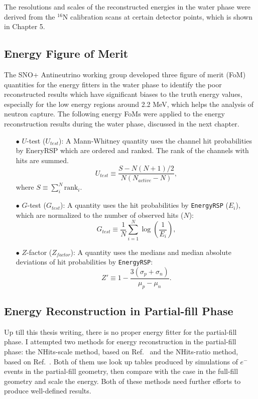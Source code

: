 The resolutions and scales of the reconstructed energies in the water phase were derived from the $^{16}$N calibration scans at certain detector points, which is shown in Chapter 5.

\subsection{Energy Figure of Merit}\label{sect:energy_fom}
The SNO+ Antineutrino working group developed three figure of merit (FoM) quantities for the energy fitters in the water phase to identify the poor reconstructed results which have significant biases to the truth energy values, especially for the low energy regions around 2.2 MeV, which helps the analysis of neutron capture\cite{waterFoM,waterunidoc}. The following energy FoMs were applied to the energy reconstruction results during the water phase, discussed in the next chapter.

\begin{itemize}
	\item[$\bullet$]$U$-test ($U_{test}$):
	A Mann-Whitney quantity uses the channel hit probabilities by EneryRSP which are ordered and ranked. The rank of the channels with hits are summed.%
		\begin{equation}
		U_{test}\equiv \frac{S-N(N+1)/2}{N(N_{active}-N)},
		\end{equation}
	where $S\equiv \sum_{i}^N \mathrm{rank}_i$. 
	
	\item[$\bullet$] $G$-test ($G_{test}$):
	A quantity uses the hit probabilities by \texttt{EnergyRSP} ($E_i$), which are normalized to the number of observed hits ($N$):
	\begin{equation}
	G_{test}\equiv \frac{1}{N}\sum_{i=1}^N \log(\frac{1}{E_i}),
	\end{equation}
	
	\item[$\bullet$] $Z$-factor ($Z_{factor}$):
	A quantity uses the medians and median absolute deviations of hit probabilities by \texttt{EnergyRSP}:
	\begin{equation}
     Z'\equiv 1-\frac{3(\sigma_p+\sigma_n)}{\mu_p-\mu_n}.
    \end{equation}
\end{itemize}

\subsection{Energy Reconstruction in Partial-fill Phase}
Up till this thesis writing, there is no proper energy fitter for the partial-fill phase. I attempted two methods for energy reconstruction in the partial-fill phase: the NHits-scale method, based on Ref.~\cite{partialEnergy} and the NHits-ratio method, based on Ref.~\cite{partialEnergyYang}. Both of them use look up tables produced by simulations of $e^-$ events in the partial-fill geometry, then compare with the case in the full-fill geometry and scale the energy. Both of these methods need further efforts to produce well-defined results\cite{jiePartialEnergy,jiePartialEnergyNhitRatio}.

